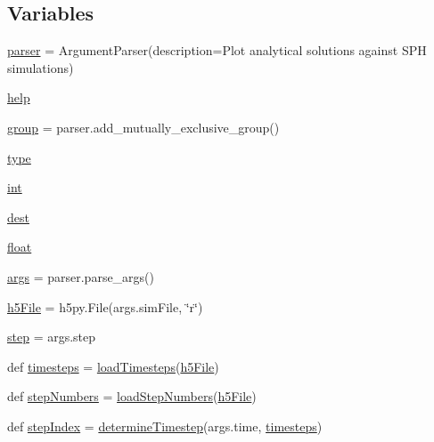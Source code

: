 \subsection*{Variables}
\begin{DoxyCompactItemize}
\item 
\mbox{\hyperlink{namespacecompare__solutions_aaa674c7b4d40ea358b43f7885e5a4478}{parser}} = Argument\+Parser(description=\textquotesingle{}Plot analytical solutions against S\+PH simulations\textquotesingle{})
\item 
\mbox{\hyperlink{namespacecompare__solutions_a9080d9429fc80d60afe5c00891a789e5}{help}}
\item 
\mbox{\hyperlink{namespacecompare__solutions_a10f260ee6120d40fa1a0eee1754b0290}{group}} = parser.\+add\+\_\+mutually\+\_\+exclusive\+\_\+group()
\item 
\mbox{\hyperlink{namespacecompare__solutions_a90f6d241dd840b9ca87fadfda12072a8}{type}}
\item 
\mbox{\hyperlink{namespacecompare__solutions_a73d633d24717b7bdfb5ba69fd060eabc}{int}}
\item 
\mbox{\hyperlink{namespacecompare__solutions_ac24064a7b0bd52f0450ec16df2afa3ff}{dest}}
\item 
\mbox{\hyperlink{namespacecompare__solutions_a0f2391abad6d329f3af95b8628d8fc43}{float}}
\item 
\mbox{\hyperlink{namespacecompare__solutions_afdf0a0885cc9bdea3b4b206990ab35a3}{args}} = parser.\+parse\+\_\+args()
\item 
\mbox{\hyperlink{namespacecompare__solutions_a9aff00b9f52225aceb635bcc6230e32c}{h5\+File}} = h5py.\+File(args.\+sim\+File, \char`\"{}r\char`\"{})
\item 
\mbox{\hyperlink{namespacecompare__solutions_a9e016da601f62bd2e5d85bce6a22bfb6}{step}} = args.\+step
\item 
def \mbox{\hyperlink{namespacecompare__solutions_a0c934f0f38e7ab253392939e3068c05e}{timesteps}} = \mbox{\hyperlink{namespacecompare__solutions_a027a643ca4b78f4096ae7c990da396d4}{load\+Timesteps}}(\mbox{\hyperlink{namespacecompare__solutions_a9aff00b9f52225aceb635bcc6230e32c}{h5\+File}})
\item 
def \mbox{\hyperlink{namespacecompare__solutions_a2a151e40a9edaf958d726ac3999ac374}{step\+Numbers}} = \mbox{\hyperlink{namespacecompare__solutions_a3e94566cadb571133ea525491b2e573e}{load\+Step\+Numbers}}(\mbox{\hyperlink{namespacecompare__solutions_a9aff00b9f52225aceb635bcc6230e32c}{h5\+File}})
\item 
def \mbox{\hyperlink{namespacecompare__solutions_ac1e662b0bd5c6fffe31397dd114f1a9a}{step\+Index}} = \mbox{\hyperlink{namespacecompare__solutions_a93703a7dfe643e19a4ac6d56ceca5b6e}{determine\+Timestep}}(args.\+time, \mbox{\hyperlink{namespacecompare__solutions_a0c934f0f38e7ab253392939e3068c05e}{timesteps}})

\end{DoxyCompactItemize}
